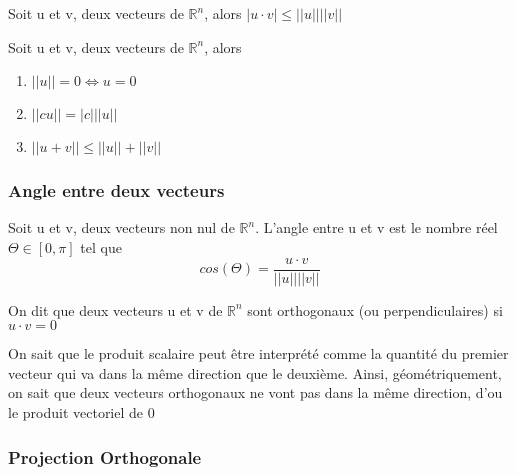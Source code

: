 \documentclass{article}
\begin{document}
\begin{theorem}
    Soit u et v, deux vecteurs de $\mathbb{R}^n$, alors
    $ | u \cdot v | \leq ||u|| ||v||$
\end{theorem}

\begin{theorem}
    Soit u et v, deux vecteurs de $\mathbb{R}^n$, alors
    \begin{enumerate}
	\item $ ||u||=0 \Longleftrightarrow u=0$
	\item $ ||cu|| = |c| ||u||$
	\item $ || u+v || \leq ||u||+||v||$
    \end{enumerate}
\end{theorem}

\subsubsection{Angle entre deux vecteurs}

\begin{theorem}
    Soit u et v, deux vecteurs non nul de $\mathbb{R}^n$. L'angle entre
    u et v est le nombre réel $\Theta \in [0, \pi]$ tel que
    $$ cos(\Theta) = \frac{u \cdot v}{||u||||v||}$$
\end{theorem}

\begin{intuition}
\end{intuition}

\begin{theorem}
    On dit que deux vecteurs u et v de $\mathbb{R}^n$ sont orthogonaux
    (ou perpendiculaires) si $u \cdot v = 0$
\end{theorem}

\begin{intuition}
    On sait que le produit scalaire peut être interprété comme la
    quantité du premier vecteur qui va dans la même direction que le
    deuxième. Ainsi, géométriquement, on sait que deux vecteurs orthogonaux
    ne vont pas dans la même direction, d'ou le produit vectoriel de 0
\end{intuition}

\subsubsection{Projection Orthogonale}
\end{document}

